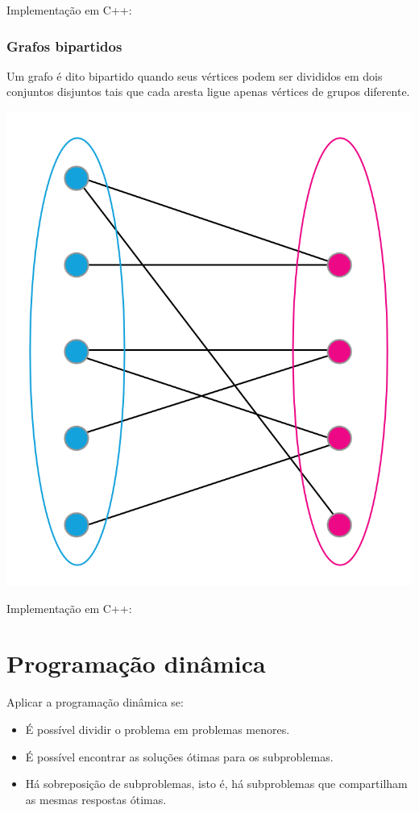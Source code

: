 \documentclass[a4paper,12pt]{article}
\begin{document}
\noindent Implementação em C++:

\subsubsection{Grafos bipartidos}
Um grafo é dito bipartido quando seus vértices podem ser divididos em dois conjuntos disjuntos tais que cada aresta ligue apenas vértices de grupos diferente.

\begin{center}
  \includegraphics[width=\linewidth/2]{figures/grafos/grafos_bipartidos.png}
\end{center}

\noindent Implementação em C++:

\newpage

\section{Programação dinâmica}

\indent Aplicar a programação dinâmica se:

\begin{itemize}
    \item É possível dividir o problema em problemas menores.
    \item É possível encontrar as soluções ótimas para os subproblemas.
    \item Há sobreposição de subproblemas, isto é, há subproblemas que compartilham as mesmas respostas ótimas.
\end{itemize}
\end{document}
